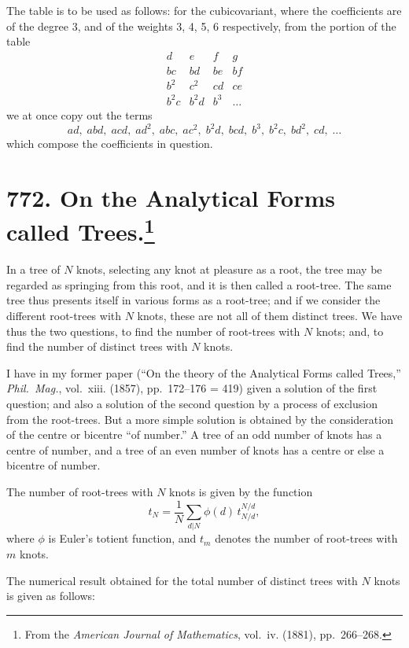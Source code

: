 \documentclass[11pt,a4paper]{book}
\begin{document}
The table is to be used as follows: for the cubicovariant, where the coefficients are of the degree 3, and of the weights 3, 4, 5, 6 respectively, from the portion of the table
\[
\begin{array}{cccc}
d & e & f & g \\
bc & bd & be & bf \\
b^2 & c^2 & cd & ce \\
b^2c & b^2d & b^3 & \dots
\end{array}
\]
we at once copy out the terms
\[
ad,\; abd,\; acd,\; ad^2,\; abc,\; ac^2,\; b^2d,\; bcd,\; b^3,\; b^2c,\; bd^2,\; cd,\; \dots
\]
which compose the coefficients in question.

\newpage
\section[On the Analytical Forms called Trees]{772. On the Analytical Forms called Trees.\footnote{From the \textit{American Journal of Mathematics}, vol.~iv. (1881), pp.~266--268.}}

In a tree of $N$ knots, selecting any knot at pleasure as a root, the tree may be regarded as springing from this root, and it is then called a root-tree. The same tree thus presents itself in various forms as a root-tree; and if we consider the different root-trees with $N$ knots, these are not all of them distinct trees. We have thus the two questions, to find the number of root-trees with $N$ knots; and, to find the number of distinct trees with $N$ knots.

I have in my former paper (``On the theory of the Analytical Forms called Trees,'' \textit{Phil.~Mag.}, vol.~xiii. (1857), pp.~172--176 = 419) given a solution of the first question; and also a solution of the second question by a process of exclusion from the root-trees. But a more simple solution is obtained by the consideration of the centre or bicentre ``of number.'' A tree of an odd number of knots has a centre of number, and a tree of an even number of knots has a centre or else a bicentre of number.

The number of root-trees with $N$ knots is given by the function
\[
t_N = \frac{1}{N}\sum_{d|N} \phi(d)\, t_{N/d}^{N/d},
\]
where $\phi$ is Euler's totient function, and $t_m$ denotes the number of root-trees with $m$ knots.

The numerical result obtained for the total number of distinct trees with $N$ knots is given as follows:
\end{document}
